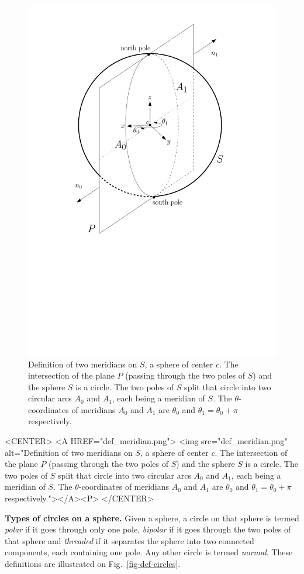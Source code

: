 \begin{ccTexOnly}
\begin{figure}[ht!]
\centerline{
 \includegraphics[height=.5\textwidth]{Circular_kernel_3/def_meridian}
}
\caption{Definition of two meridians on $S$, a sphere of center $c$.
The intersection of the plane $P$ (passing through the two poles of $S$)
and the sphere $S$ is a circle. The two poles of $S$ split that circle into two circular arcs $A_0$ and $A_1$, each being a meridian of $S$. 
The $\theta$-coordinates of meridians $A_0$ and $A_1$ are $\theta_0$ and $\theta_1= \theta_0 + \pi$ respectively.
\label{fig-def-meridian}}
\end{figure}
\end{ccTexOnly}

\begin{ccHtmlOnly}
    <CENTER>
    <A HREF="def_meridian.png">
        <img src="def_meridian.png" alt="Definition of two meridians on $S$, a sphere of center $c$.
The intersection of the plane $P$ (passing through the two poles of $S$)
and the sphere $S$ is a circle. The two poles of $S$ split that circle into two circular arcs $A_0$ and $A_1$, each being a meridian of $S$. 
The $\theta$-coordinates of meridians $A_0$ and $A_1$ are $\theta_0$ and $\theta_1= \theta_0 + \pi$ respectively."></A><P>
    </CENTER>
\end{ccHtmlOnly}


\textbf{Types of circles on a sphere.}
Given a sphere, a circle on that sphere is termed
\textit{polar} if it goes through only one pole, \textit{bipolar} if
it goes through the two poles of that sphere and \textit{threaded} if
it separates the sphere into two connected components, each
containing one pole. Any other circle is termed \textit{normal}. These
definitions are illustrated on Fig.~\ref{fig-def-circles}.

